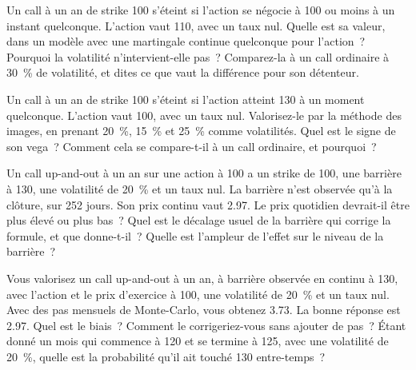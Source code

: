 \begin{question}\label{iq:iv2:pricing-and-numerics:36}
Un call à un an de strike 100 s'éteint si l'action se négocie à 100 ou moins à un instant quelconque. L'action vaut 110, avec un taux nul. Quelle est sa valeur, dans un modèle avec une martingale continue quelconque pour l'action~? Pourquoi la volatilité n'intervient-elle pas~? Comparez-la à un call ordinaire à 30~\% de volatilité, et dites ce que vaut la différence pour son détenteur.
\end{question}

\begin{question}\label{iq:iv2:pricing-and-numerics:37}
Un call à un an de strike 100 s'éteint si l'action atteint 130 à un moment quelconque. L'action vaut 100, avec un taux nul. Valorisez-le par la méthode des images, en prenant 20~\%, 15~\% et 25~\% comme volatilités. Quel est le signe de son vega~? Comment cela se compare-t-il à un call ordinaire, et pourquoi~?
\end{question}

\begin{question}\label{iq:iv2:pricing-and-numerics:38}
Un call up-and-out à un an sur une action à 100 a un strike de 100, une barrière à 130, une volatilité de 20~\% et un taux nul. La barrière n'est observée qu'à la clôture, sur 252 jours. Son prix continu vaut 2.97. Le prix quotidien devrait-il être plus élevé ou plus bas~? Quel est le décalage usuel de la barrière qui corrige la formule, et que donne-t-il~? Quelle est l'ampleur de l'effet sur le niveau de la barrière~?
\end{question}

\begin{question}\label{iq:iv2:pricing-and-numerics:39}
Vous valorisez un call up-and-out à un an, à barrière observée en continu à 130, avec l'action et le prix d'exercice à 100, une volatilité de 20~\% et un taux nul. Avec des pas mensuels de Monte-Carlo, vous obtenez 3.73. La bonne réponse est 2.97. Quel est le biais~? Comment le corrigeriez-vous sans ajouter de pas~? Étant donné un mois qui commence à 120 et se termine à 125, avec une volatilité de 20~\%, quelle est la probabilité qu'il ait touché 130 entre-temps~?
\end{question}

